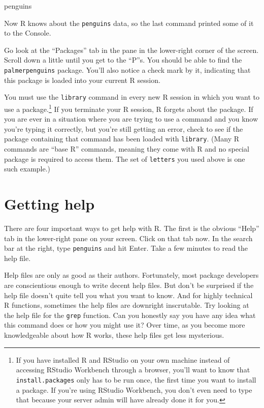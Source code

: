 \documentclass[
]{book}
\newenvironment{Shaded}{\begin{snugshade}}{\end{snugshade}}
\newcommand{\NormalTok}[1]{#1}
\begin{document}
\begin{Shaded}
\begin{Highlighting}[]
\NormalTok{penguins}
\end{Highlighting}
\end{Shaded}

Now R knows about the \texttt{penguins} data, so the last command printed some of it to the Console.

Go look at the ``Packages'' tab in the pane in the lower-right corner of the screen. Scroll down a little until you get to the ``P''s. You should be able to find the \texttt{palmerpenguins} package. You'll also notice a check mark by it, indicating that this package is loaded into your current R session.

You must use the \texttt{library} command in every new R session in which you want to use a package.\footnote{If you have installed R and RStudio on your own machine instead of accessing RStudio Workbench through a browser, you'll want to know that \texttt{install.packages} only has to be run once, the first time you want to install a package. If you're using RStudio Workbench, you don't even need to type that because your server admin will have already done it for you.} If you terminate your R session, R forgets about the package. If you are ever in a situation where you are trying to use a command and you know you're typing it correctly, but you're still getting an error, check to see if the package containing that command has been loaded with \texttt{library}. (Many R commands are ``base R'' commands, meaning they come with R and no special package is required to access them. The set of \texttt{letters} you used above is one such example.)

\hypertarget{intror-gettinghelp}{%
\section{Getting help}\label{intror-gettinghelp}}

There are four important ways to get help with R. The first is the obvious ``Help'' tab in the lower-right pane on your screen. Click on that tab now. In the search bar at the right, type \texttt{penguins} and hit Enter. Take a few minutes to read the help file.

Help files are only as good as their authors. Fortunately, most package developers are conscientious enough to write decent help files. But don't be surprised if the help file doesn't quite tell you what you want to know. And for highly technical R functions, sometimes the help files are downright inscrutable. Try looking at the help file for the \texttt{grep} function. Can you honestly say you have any idea what this command does or how you might use it? Over time, as you become more knowledgeable about how R works, these help files get less mysterious.
\end{document}
